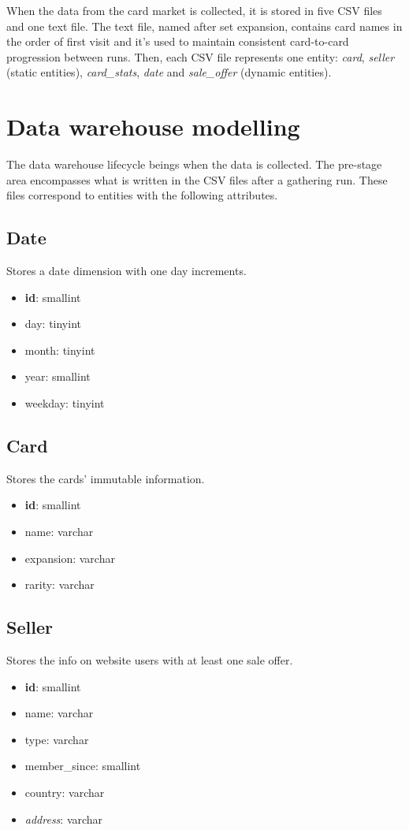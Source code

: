 When the data from the card market is collected, it is stored in five CSV files and one text file. The text file, named after set expansion, contains card names in the order of first visit and it's used to maintain consistent card-to-card progression between runs. Then, each CSV file represents one entity: \textit{card}, \textit{seller} (static entities), \textit{card\_stats}, \textit{date} and \textit{sale\_offer} (dynamic entities).

\section{Data warehouse modelling}
The data warehouse lifecycle beings when the data is collected. The pre-stage area encompasses what is written in the CSV files after a gathering run. These files correspond to entities with the following attributes.

\subsection*{Date}
Stores a date dimension with one day increments.
\begin{itemize}
\setlength\itemsep{0.2em}
\item \textbf{id}: smallint
\item day: tinyint
\item month: tinyint
\item year: smallint
\item weekday: tinyint
\end{itemize}

\subsection*{Card}
Stores the cards' immutable information.
\begin{itemize}
\setlength\itemsep{0.2em}
\item \textbf{id}: smallint
\item name: varchar
\item expansion: varchar
\item rarity: varchar
\end{itemize}

\subsection*{Seller}
Stores the info on website users with at least one sale offer.
\begin{itemize}
\setlength\itemsep{0.2em}
\item \textbf{id}: smallint
\item name: varchar
\item type: varchar
\item member\_since: smallint
\item country: varchar
\item \textit{address}: varchar
\end{itemize}

